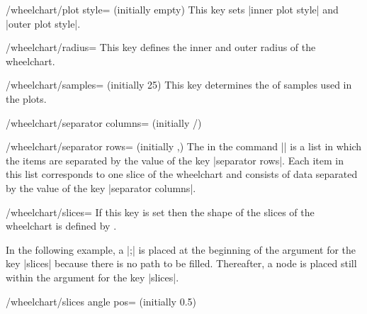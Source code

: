 \documentclass[a4paper,english,dvipsnames]{ltxdoc}
\begin{document}
\begin{stylekey}{/wheelchart/plot style= (initially \normalfont empty)}
This key sets |inner plot style| and |outer plot style|.
\end{stylekey}
\begin{key}{/wheelchart/radius=}
This key defines the inner and outer radius of the wheelchart.
\end{key}
\begin{key}{/wheelchart/samples= (initially 25)}
This key determines the  of samples used in the plots.
\end{key}
\begin{key}{/wheelchart/separator columns= (initially /)}
\end{key}
\begin{key}{/wheelchart/separator rows= (initially ,)}
The  in the command |\wheelchart| is a list in which the items are separated by the value of the key |separator rows|. Each item in this list corresponds to one slice of the wheelchart and consists of data separated by the value of the key |separator columns|.
\end{key}
\begin{key}{/wheelchart/slices=}
If this key is set then the shape of the slices of the wheelchart is defined by .

In the following example, a |;| is placed at the beginning of the argument for the key |slices| because there is no path to be filled. Thereafter, a node is placed still within the argument for the key |slices|.
\begin{codeexample}[width=10cm]
\end{codeexample}
\end{key}
\begin{key}{/wheelchart/slices angle pos= (initially 0.5)}
\end{key}
\end{document}
